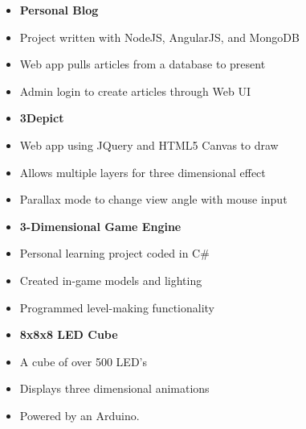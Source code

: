 \documentclass{article}
\begin{document}
\begin{minipage}[t]{0.5\textwidth}
  \vspace{0.5mm}
  \begin{itemize}[leftmargin=4mm]
    \item[] {\bf Personal Blog } \\[-0.5mm]   
    \item[] Project written with NodeJS, AngularJS, and MongoDB \\[-2mm]   
    \item[] Web app pulls articles from a database to present \\[-2mm]   
    \item[] Admin login to create articles through Web UI \\[2mm]
    \item[] {\bf 3Depict } \\[-0.5mm]   
    \item[] Web app using JQuery and HTML5 Canvas to draw \\[-2mm]   
    \item[] Allows multiple layers for three dimensional effect \\[-2mm]   
    \item[] Parallax mode to change view angle with mouse input 
  \end{itemize}
\end{minipage}
\begin{minipage}[t]{0.5\textwidth}
  \vspace{0.5mm}
  \begin{itemize}[leftmargin=4mm]
    \item[] {\bf 3-Dimensional Game Engine } \\[-0.5mm]   
    \item[] Personal learning project coded in C\# \\[-2mm]   
    \item[] Created in-game models and lighting  \\[-2mm]   
    \item[] Programmed level-making functionality \\[2mm]
    \item[] {\bf 8x8x8 LED Cube } \\[-0.5mm]   
    \item[] A cube of over 500 LED's \\[-2mm]   
    \item[] Displays three dimensional animations \\[-2mm]   
    \item[] Powered by an Arduino. 
  \end{itemize}
\end{minipage}
\end{document}
